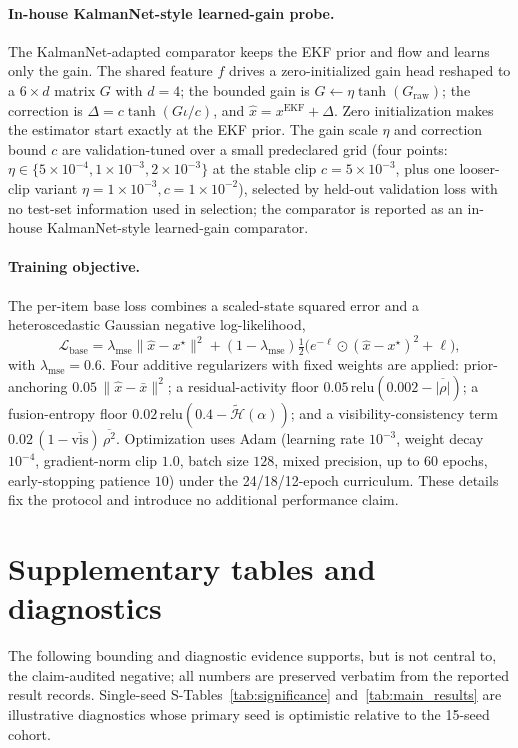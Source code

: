 \documentclass{article}
\begin{document}
\paragraph{In-house KalmanNet-style learned-gain probe.}
The KalmanNet-adapted comparator keeps the EKF prior and flow and learns only the gain. The shared feature \(f\) drives a zero-initialized gain head reshaped to a \(6\times d\) matrix \(G\) with \(d=4\); the bounded gain is \(G\leftarrow\eta\tanh(G_{\mathrm{raw}})\); the correction is \(\Delta=c\tanh(G\iota/c)\), and \(\hat{x}=x^{\mathrm{EKF}}+\Delta\). Zero initialization makes the estimator start exactly at the EKF prior. The gain scale \(\eta\) and correction bound \(c\) are validation-tuned over a small predeclared grid (four points: \(\eta\in\{5\times10^{-4},1\times10^{-3},2\times10^{-3}\}\) at the stable clip \(c=5\times10^{-3}\), plus one looser-clip variant \(\eta=1\times10^{-3},c=1\times10^{-2}\)), selected by held-out validation loss with no test-set information used in selection; the comparator is reported as an in-house KalmanNet-style learned-gain comparator.

\paragraph{Training objective.}
The per-item base loss combines a scaled-state squared error and a heteroscedastic Gaussian negative log-likelihood,
\[
\mathcal{L}_{\mathrm{base}}=\lambda_{\mathrm{mse}}\big\lVert\hat{x}-x^{\star}\big\rVert^{2}+(1-\lambda_{\mathrm{mse}})\tfrac12\big(e^{-\ell}\odot(\hat{x}-x^{\star})^{2}+\ell\big),
\]
with \(\lambda_{\mathrm{mse}}=0.6\). Four additive regularizers with fixed weights are applied: prior-anchoring \(0.05\,\lVert\hat{x}-\bar{x}\rVert^{2}\); a residual-activity floor \(0.05\,\mathrm{relu}(0.002-\overline{|\rho|})\); a fusion-entropy floor \(0.02\,\mathrm{relu}(0.4-\tilde{\mathcal H}(\alpha))\); and a visibility-consistency term \(0.02\,(1-\overline{\mathrm{vis}})\,\overline{\rho^{2}}\). Optimization uses Adam (learning rate \(10^{-3}\), weight decay \(10^{-4}\), gradient-norm clip \(1.0\), batch size \(128\), mixed precision, up to \(60\) epochs, early-stopping patience \(10\)) under the 24/18/12-epoch curriculum. These details fix the protocol and introduce no additional performance claim.

\section{Supplementary tables and diagnostics}
\label{app:supplementary}
\scriptsize
The following bounding and diagnostic evidence supports, but is not central to, the claim-audited negative; all numbers are preserved verbatim from the reported result records. Single-seed S-Tables~\ref{tab:significance} and~\ref{tab:main_results} are illustrative diagnostics whose primary seed is optimistic relative to the 15-seed cohort.
\end{document}
